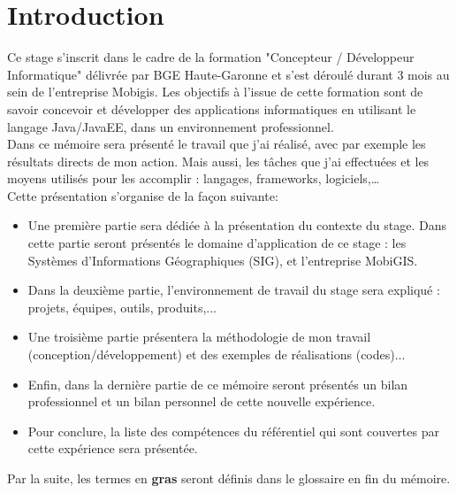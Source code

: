 \chapter{Introduction} 
\label{Introduction}

Ce stage s'inscrit dans le cadre de la formation "Concepteur / Développeur Informatique" délivrée par BGE Haute-Garonne et s'est déroulé durant 3 mois au sein de l'entreprise Mobigis. Les objectifs à l'issue de cette formation sont de savoir concevoir et développer des applications informatiques en utilisant le langage Java/JavaEE, dans un environnement professionnel.\\

Dans ce mémoire sera présenté le travail que j'ai réalisé, avec par exemple les résultats directs de mon action. Mais aussi, les tâches que j'ai effectuées et les moyens utilisés pour les accomplir : langages, frameworks, logiciels,…\\
 
Cette présentation s'organise de la façon suivante:\newline

\begin{itemize}
\item Une première partie sera dédiée à la présentation du contexte du stage. Dans cette partie seront présentés le domaine d'application de ce stage : les Systèmes d'Informations Géographiques (SIG), et l'entreprise MobiGIS.\\

\item Dans la deuxième partie, l'environnement de travail du stage sera expliqué : projets, équipes, outils, produits,...\\

\item Une troisième partie présentera la méthodologie de mon travail (conception/développement) et des exemples de réalisations (codes)...\\

\item Enfin, dans la dernière partie de ce mémoire seront présentés un bilan professionnel et un bilan personnel de cette nouvelle expérience. \\

\item Pour conclure, la liste des compétences du référentiel qui sont couvertes par cette expérience sera présentée.\newline

\end{itemize}

Par la suite, les termes en \textbf{gras} seront définis dans le glossaire en fin du mémoire.

